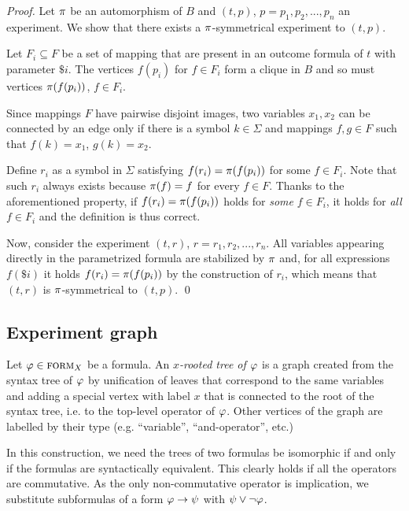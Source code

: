 \begin{proof}
Let $\pi$ be an automorphism of $B$ and $(t, p)$, $p=p_1,p_2,...,p_n$ an experiment.
We show that there exists a $\pi$-symmetrical experiment to $(t, p)$.

Let $F_i\subseteq F$ be a set of mapping that are present in an outcome formula
  of $t$ with parameter $\$i$.
The vertices $f(p_i)$ for $f\in F_i$ form a clique in $B$ and so must vertices
$\pi(f(p_i))$, $f\in F_i$.

Since mappings $F$ have pairwise disjoint images, two variables $x_1, x_2$
  can be connected by an edge only if there is a symbol $k\in\Sigma$ and
  mappings $f,g\in F$ such that $f(k)=x_1$, $g(k)=x_2$.

Define $r_i$ as a symbol in $\Sigma$ satisfying $f(r_i) = \pi(f(p_i))$ for some $f\in F_i$.
Note that such $r_i$ always exists because $\pi(f) = f$ for every $f\in F$.
Thanks to the aforementioned property,
  if $f(r_i) = \pi(f(p_i))$ holds
  for \emph{some} $f\in F_i$,
  it holds for \emph{all} $f\in F_i$ and the definition is thus correct.

Now, consider the experiment $(t, r)$, $r=r_1,r_2,...,r_n$.
All variables appearing directly in the parametrized formula are stabilized by $\pi$ and,
  for all expressions $f(\$i)$ it holds $f(r_i)=\pi(f(p_i))$ by the construction of $r_i$,
  which means that $(t, r)$ is $\pi$-symmetrical to $(t, p)$. \qed
\end{proof}

\subsection{Experiment graph}

Let $\varphi\in\textsc{form}_X$ be a formula.
An \emph{$x$-rooted tree of $\varphi$}
  is a graph created from the syntax tree of $\varphi$
  by unification of leaves that correspond to the same variables
  and adding a special vertex with label $x$ that is connected to the root
  of the syntax tree, i.e. to the top-level operator of $\varphi$.
Other vertices of the graph are labelled by their type (e.g. ``variable'', ``and-operator'', etc.)

In this construction, we need the trees of two formulas be isomorphic if
  and only if the formulas are syntactically equivalent.
This clearly holds if all the operators are commutative.
As the only non-commutative operator is implication, we substitute
subformulas of a form $\varphi -> \psi$ with $\psi \vee \neg\varphi$.

